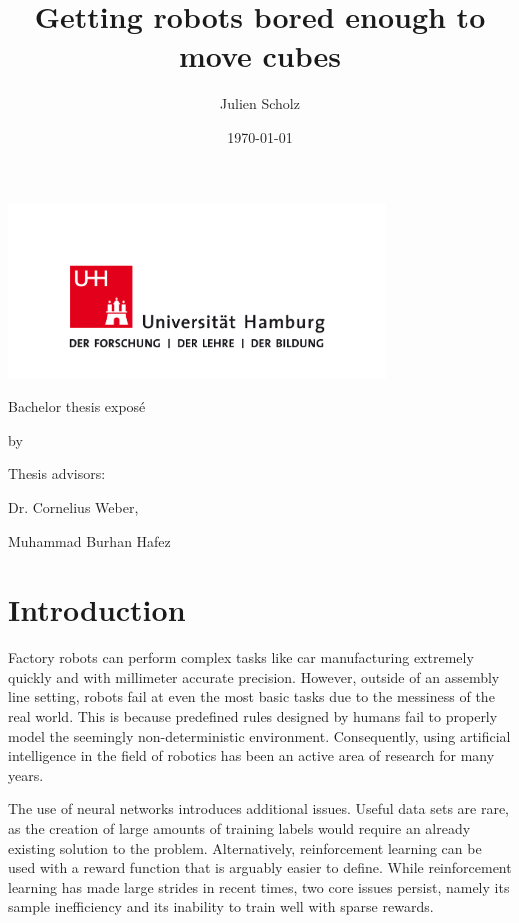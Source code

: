 \documentclass{article}
\title{Getting robots bored enough to move cubes}
\author{Julien Scholz}
\date{\today}
\begin{document}
\begin{titlepage}
    \centering
    \includegraphics[width=10cm]{uhh_logo}\par
    \vspace{4\baselineskip}
    {\Large Bachelor thesis exposé\par}
    {\Huge \thetitle \par}
    \vspace{4\baselineskip}
    by\par
    {\Large \theauthor \par}
    \vspace{8\baselineskip}
    \vfill
    Thesis advisors:\par
    {\large Dr. Cornelius Weber, \par Muhammad Burhan Hafez}
\end{titlepage}

\tableofcontents

\section{Introduction}
Factory robots can perform complex tasks like car manufacturing extremely quickly and with millimeter accurate precision. However, outside of an assembly line setting, robots fail at even the most basic tasks due to the messiness of the real world. This is because predefined rules designed by humans fail to properly model the seemingly non-deterministic environment. Consequently, using artificial intelligence in the field of robotics has been an active area of research for many years.

The use of neural networks introduces additional issues. Useful data sets are rare, as the creation of large amounts of training labels would require an already existing solution to the problem. Alternatively, reinforcement learning can be used with a reward function that is arguably easier to define. While reinforcement learning has made large strides in recent times, two core issues persist, namely its sample inefficiency and its inability to train well with sparse rewards.
\end{document}
